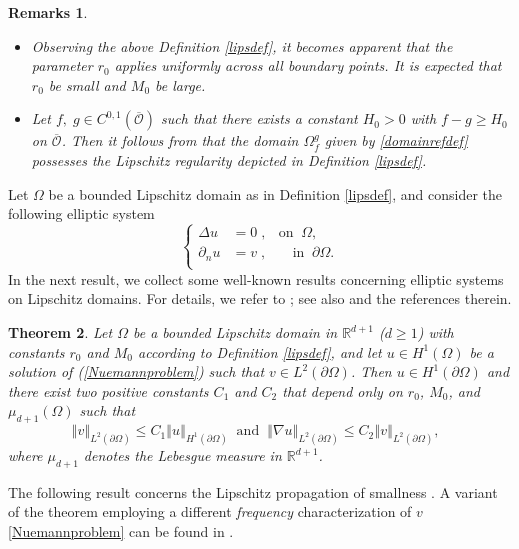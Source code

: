 \documentclass[11pt]{article}
\newtheorem{theorem}{Theorem}
\newtheorem{remarks}[theorem]{Remarks}
\begin{document}
\begin{remarks}\label{remarks-on-the-Lipshitz-domain}$\quad$\\
	\begin{itemize}
		\item Observing the above Definition \ref{lipsdef}, it becomes apparent that the parameter $r_0$ applies uniformly across all boundary points. It is expected that $r_0$ be small and $M_0$ be large. 
		\item Let $f,\;g \in C^{0,1}(\overline{\mathcal O})$ such that there exists a constant $H_0>0$ with $f-g\geq H_0$
    on $\overline{\mathcal O}$. Then it follows from \cite{henrot2005variation}  that the domain $\Omega_f^g$ given by \eqref{domainrefdef} possesses the Lipschitz regularity depicted in Definition \ref{lipsdef}.
	\end{itemize}
\end{remarks}
Let $\Omega$ be a bounded  Lipschitz domain as in  Definition \ref{lipsdef}, and consider the following  elliptic system
\begin{equation}\label{Nuemannproblem}
	\left\{
	\begin{array}{rrrrr}
		\Delta u &=0\;,&\text{on}\; \; \Omega,\\
		\partial_n u &=v\;,&\quad \text{in}\;\;  \partial\Omega.\\
	\end{array}
	\right.
\end{equation}
In the next  result, we collect some well-known results concerning elliptic systems on Lipschitz domains. For details, we refer to \cite{kenig1994harmonic}; see also \cite[Proof of Lemma 4.5]{alessandrini2003size} and the references therein.

\begin{theorem}\label{usfulequalities}
	Let $\Omega$ be a bounded Lipschitz domain in $\mathbb{R}^{d+1}$ ($d\ge 1 $)  with constants  $r_0$ and $M_0$ according to  Definition \ref{lipsdef}, and let $u\in H^{1}(\Omega)$ be a solution of (\ref{Nuemannproblem}) such that  $v \in L^2(\partial\Omega)$. Then $u\in H^1(\partial \Omega)$ and  there exist two positive constants $C_1$ and $C_2$ that depend only on $r_0$, $M_0$, and $\mu_{d+1} (\Omega)$ such that
	\begin{equation}\label{inequalityimportnat}
		\left\Vert  v\right\Vert_{L^2(\partial\Omega)}\leq C_1  \left\Vert   u \right\Vert_{H^1(\partial\Omega)}\;\; \text{and}\;\; \left\Vert \nabla u \right\Vert_{L^2(\partial\Omega)}\leq C_2  \left\Vert  v \right\Vert_{L^2(\partial\Omega)},\;\;
	\end{equation}
	where $\mu_{d+1} $ denotes the  Lebesgue measure in $\mathbb R ^{d+1}$.
\end{theorem}
The following result concerns the Lipschitz propagation of smallness \cite[Lemma~2.2 and the remark p.~63]{alessandrini2000optimal}. A variant of the theorem employing a different \textit{frequency} characterization of $v$ \eqref{Nuemannproblem} can be found in \cite{alessandrini2003size}.
\end{document}
